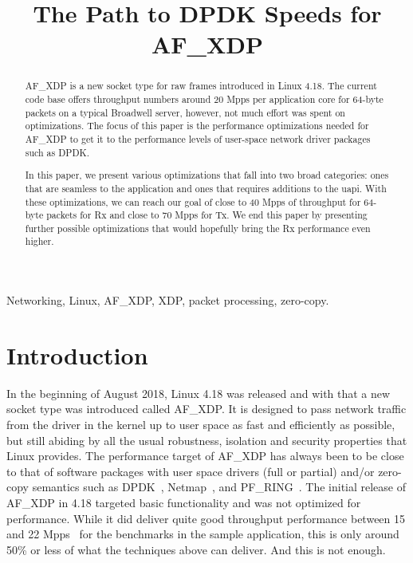 \documentclass[9pt,numbers,reprint]{sigplanconf}
\title{The Path to DPDK Speeds for AF\_XDP}
\begin{document}
\makeatletter
\def\@copyrightspace{\relax}
\makeatother

\maketitle

\begin{abstract}
AF\_XDP is a new socket type for raw frames introduced in Linux
4.18. The current code base offers throughput numbers around 20 Mpps
per application core for 64-byte packets on a typical Broadwell
server, however, not much effort was spent on optimizations. The focus
of this paper is the performance optimizations needed for AF\_XDP to
get it to the performance levels of user-space network driver packages
such as DPDK.

In this paper, we present various optimizations that fall into two
broad categories: ones that are seamless to the application and ones
that requires additions to the uapi. With these optimizations, we can
reach our goal of close to 40 Mpps of throughput for 64-byte packets
for Rx and close to 70 Mpps for Tx. We end this paper by presenting
further possible optimizations that would hopefully bring the Rx
performance even higher.
\end{abstract}

\keywords
Networking, Linux, AF\_XDP, XDP, packet processing, zero-copy.

\section{Introduction}
In the beginning of August 2018, Linux 4.18 was released and with that
a new socket type was introduced called AF\_XDP. It is designed to
pass network traffic from the driver in the kernel up to user space as
fast and efficiently as possible, but still abiding by all the usual
robustness, isolation and security properties that Linux provides. The
performance target of AF\_XDP has always been to be close to that of
software packages with user space drivers (full or partial) and/or
zero-copy semantics such as DPDK~\cite{dpdk}, Netmap~\cite{netmap},
and PF\_RING~\cite{pfring}. The initial release of AF\_XDP in 4.18
targeted basic functionality and was not optimized for
performance. While it did deliver quite good throughput performance
between 15 and 22 Mpps~\cite{af_xdp_patch, af_xdp_patch_zc,
  af_xdp_patch_i40e, af_xdp_lwn} for the benchmarks in the sample
application, this is only around 50\% or less of what the techniques
above can deliver. And this is not enough.
\end{document}
